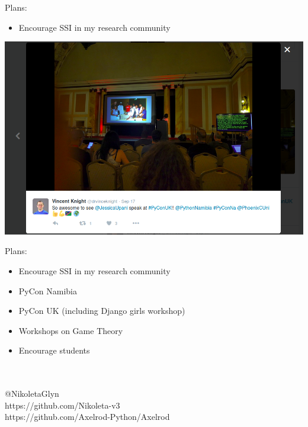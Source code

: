 \documentclass{beamer}
\begin{document}
\begin{frame}
    \begin{block}{Plans:}
    {
        \begin{itemize}
        \item Encourage SSI in my research community
        \end{itemize}
    }
    \end{block}
 \end{frame}
\begin{frame}
	\begin{center}
		\includegraphics[width=.80\textwidth]{static/namibia.png}
	\end{center}
\end{frame}

\begin{frame}
    \begin{block}{Plans:}
    {
        \begin{itemize}
        \item Encourage SSI in my research community
        \item PyCon Namibia
        \pause
        \item PyCon UK (including Django girls workshop)
        \pause
        \item Workshops on Game Theory
        \pause
        \item Encourage students 
        \end{itemize}
    }
    \end{block}
\end{frame}

\begin{frame}
	\begin{center}
		\huge{\textbf{}}\\~\\
		\small{@NikoletaGlyn}\\
		\small{https://github.com/Nikoleta-v3}\\
		\small{https://github.com/Axelrod-Python/Axelrod}
	\end{center}
\end{frame}
\end{document}
